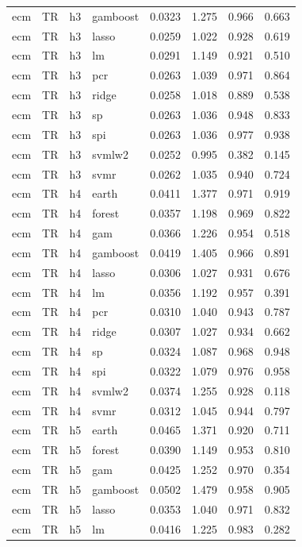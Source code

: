 \begin{ThreePartTable}
\begin{longtable}[t]{llclcccc}
ecm & TR & h3 & gamboost & 0.0323 & 1.275 & 0.966 & 0.663\\
ecm & TR & h3 & lasso & 0.0259 & 1.022 & 0.928 & 0.619\\
ecm & TR & h3 & lm & 0.0291 & 1.149 & 0.921 & 0.510\\
ecm & TR & h3 & pcr & 0.0263 & 1.039 & 0.971 & 0.864\\
ecm & TR & h3 & ridge & 0.0258 & 1.018 & 0.889 & 0.538\\
ecm & TR & h3 & sp & 0.0263 & 1.036 & 0.948 & 0.833\\
ecm & TR & h3 & spi & 0.0263 & 1.036 & 0.977 & 0.938\\
ecm & TR & h3 & svmlw2 & 0.0252 & 0.995 & 0.382 & 0.145\\
ecm & TR & h3 & svmr & 0.0262 & 1.035 & 0.940 & 0.724\\
\addlinespace
ecm & TR & h4 & earth & 0.0411 & 1.377 & 0.971 & 0.919\\
ecm & TR & h4 & forest & 0.0357 & 1.198 & 0.969 & 0.822\\
ecm & TR & h4 & gam & 0.0366 & 1.226 & 0.954 & 0.518\\
ecm & TR & h4 & gamboost & 0.0419 & 1.405 & 0.966 & 0.891\\
ecm & TR & h4 & lasso & 0.0306 & 1.027 & 0.931 & 0.676\\
ecm & TR & h4 & lm & 0.0356 & 1.192 & 0.957 & 0.391\\
ecm & TR & h4 & pcr & 0.0310 & 1.040 & 0.943 & 0.787\\
ecm & TR & h4 & ridge & 0.0307 & 1.027 & 0.934 & 0.662\\
ecm & TR & h4 & sp & 0.0324 & 1.087 & 0.968 & 0.948\\
ecm & TR & h4 & spi & 0.0322 & 1.079 & 0.976 & 0.958\\
ecm & TR & h4 & svmlw2 & 0.0374 & 1.255 & 0.928 & 0.118\\
ecm & TR & h4 & svmr & 0.0312 & 1.045 & 0.944 & 0.797\\
\addlinespace
ecm & TR & h5 & earth & 0.0465 & 1.371 & 0.920 & 0.711\\
ecm & TR & h5 & forest & 0.0390 & 1.149 & 0.953 & 0.810\\
ecm & TR & h5 & gam & 0.0425 & 1.252 & 0.970 & 0.354\\
ecm & TR & h5 & gamboost & 0.0502 & 1.479 & 0.958 & 0.905\\
ecm & TR & h5 & lasso & 0.0353 & 1.040 & 0.971 & 0.832\\
ecm & TR & h5 & lm & 0.0416 & 1.225 & 0.983 & 0.282\\

\end{longtable}
\end{ThreePartTable}
